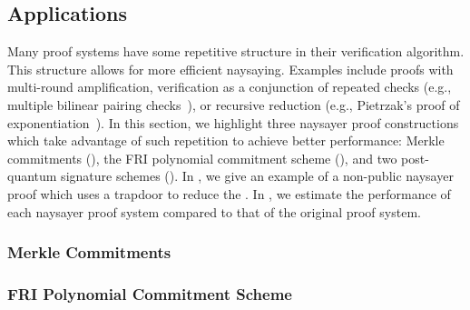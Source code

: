 \subsection{Applications}\label{sec:naysayer_apps}


Many proof systems have some repetitive structure in their verification algorithm. This structure allows for more efficient naysaying. Examples include proofs with multi-round amplification, verification as a conjunction of repeated checks (e.g., multiple bilinear pairing checks~\cite{EPRINT:GabWilCio19}), or recursive reduction (e.g., Pietrzak's proof of exponentiation~\cite{ITCS:Pietrzak19b}). In this section, we highlight three naysayer proof constructions which take advantage of such repetition to achieve better performance: Merkle commitments (), the FRI polynomial commitment scheme (), and two post-quantum signature schemes (). In , we give an example of a non-public naysayer proof which uses a trapdoor to reduce the . In , we
estimate the performance of each naysayer proof system compared to that of the original proof system.

\subsubsection{Merkle Commitments}\label{sec:merkle_naysayer}



\subsubsection{FRI Polynomial Commitment Scheme}\label{sec:fri_naysayer}


